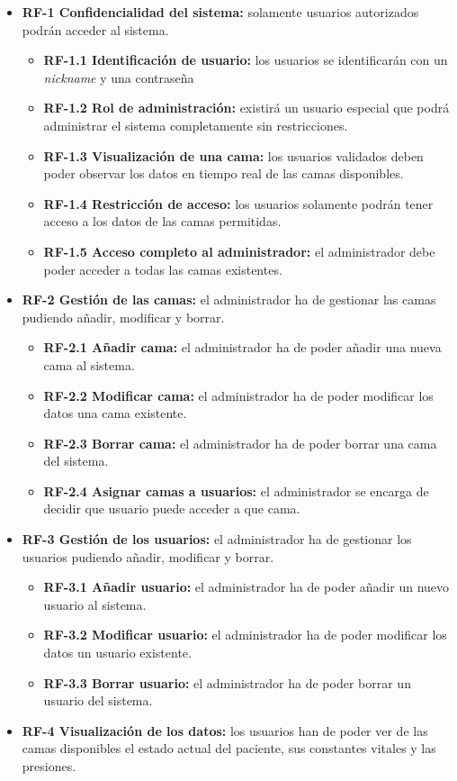 \begin{itemize}
\tightlist
\item
\textbf{RF-1 Confidencialidad del sistema:} solamente usuarios autorizados podrán acceder al sistema.
	\begin{itemize}
		\tightlist
		\item
		\textbf{RF-1.1 Identificación de usuario:} los usuarios se identificarán con un \textit{nickname} y una contraseña 
		\item
		\textbf{RF-1.2 Rol de administración:} existirá un usuario especial que podrá administrar el sistema completamente sin restricciones.
		\item 
		\textbf{RF-1.3 Visualización de una cama:} los usuarios validados deben poder observar los datos en tiempo real de las camas disponibles. 
		\item
		\textbf{RF-1.4 Restricción de acceso:} los usuarios solamente podrán tener acceso a los datos de las camas permitidas. 
		\item
		\textbf{RF-1.5 Acceso completo al administrador:} el administrador debe poder acceder a todas las camas existentes. 
	\end{itemize}	
\item
\textbf{RF-2 Gestión de las camas:} el administrador ha de gestionar las camas pudiendo añadir, modificar y borrar.
	\begin{itemize}
		\tightlist
		\item
		\textbf{RF-2.1 Añadir cama:} el administrador ha de poder añadir una nueva cama al sistema.
		\item
		\textbf{RF-2.2 Modificar cama:} el administrador ha de poder modificar los datos una cama existente.
		\item
		\textbf{RF-2.3 Borrar cama:} el administrador ha de poder borrar una cama del sistema.
		\item
		\textbf{RF-2.4 Asignar camas a usuarios:} el administrador se encarga de decidir que usuario puede acceder a que cama.
	\end{itemize}
\item
\textbf{RF-3 Gestión de los usuarios:} el administrador ha de gestionar los usuarios pudiendo añadir, modificar y borrar.
	\begin{itemize}
		\tightlist
		\item
		\textbf{RF-3.1 Añadir usuario:} el administrador ha de poder añadir un nuevo usuario al sistema.
		\item
		\textbf{RF-3.2 Modificar usuario:} el administrador ha de poder modificar los datos un usuario existente.
		\item
		\textbf{RF-3.3 Borrar usuario:} el administrador ha de poder borrar un usuario del sistema.
	\end{itemize}
\item 
\textbf{RF-4 Visualización de los datos:} los usuarios han de poder ver de las camas disponibles el estado actual del paciente, sus constantes vitales y las presiones.
\end{itemize}	
